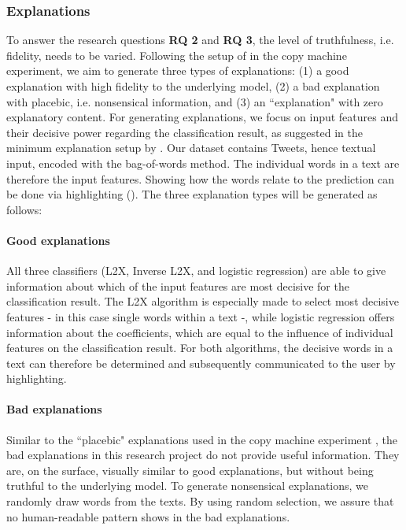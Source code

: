 \subsubsection{Explanations}
\label{subsubsec:method_explanations}
To answer the research questions \textbf{RQ 2} and \textbf{RQ 3}, the level of truthfulness, i.e. fidelity, needs to be varied. Following the setup of \cite{langer1978mindlessness} in the copy machine experiment, we aim to generate three types of explanations: (1) a good explanation with high fidelity to the underlying model, (2) a bad explanation with placebic, i.e. nonsensical information, and (3) an ``explanation" with zero explanatory content.\newline
For generating explanations, we focus on input features and their decisive power regarding the classification result, as suggested in the minimum explanation setup by \cite{goodman16eu}. Our dataset contains Tweets, hence textual input, encoded with the bag-of-words method. The individual words in a text are therefore the input features. Showing how the words relate to the prediction can be done via highlighting (\cite{arras2017relevant, chen2012detecting, feng2018pathologies}).\newline
The three explanation types will be generated as follows:
\paragraph{Good explanations}
All three classifiers (L2X, Inverse L2X, and logistic regression) are able to give information about which of the input features are most decisive for the classification result. The L2X algorithm is especially made to select most decisive features - in this case single words within a text -, while logistic regression offers information about the coefficients, which are equal to the influence of individual features on the classification result. For both algorithms, the decisive words in a text can therefore be determined and subsequently communicated to the user by highlighting.
\paragraph{Bad explanations}
Similar to the ``placebic" explanations used in the copy machine experiment \cite{langer1978mindlessness}, the bad explanations in this research project do not provide useful information. They are, on the surface, visually similar to good explanations, but without being truthful to the underlying model. To generate nonsensical explanations, we randomly draw words from the texts. By using random selection, we assure that no human-readable pattern shows in the bad explanations.
